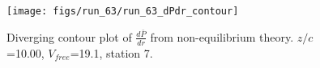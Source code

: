 \begin{figure}[H]
\centering
\texttt{[image: figs/run\_63/run\_63\_dPdr\_contour]}
\caption{Diverging contour plot of $\frac{d\bar{P}}{dr}$ from non-equilibrium theory. $z/c$=10.00, $V_{free}$=19.1, station 7.}
\label{fig:run_63_dPdr_contour}
\end{figure}


